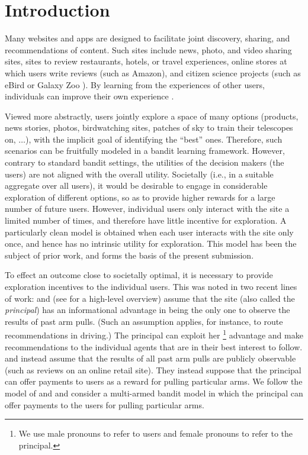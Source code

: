 \section{Introduction} \label{sec:introduction}

Many websites and apps are designed to facilitate joint discovery,
sharing, and recommendations of content.
Such sites include news, photo, and video sharing sites,
sites to review restaurants, hotels, or travel experiences,
online stores at which users write reviews (such as Amazon),
and citizen science projects
(such as eBird \citep{sullivan2009ebird,xue-ebird} or Galaxy Zoo \citep{lintott-galaxy-zoo}).
By learning from the experiences of other users, individuals can
improve their own experience \citep{schmit2017human}.

Viewed more abstractly, users jointly explore a space of
many options (products, news stories, photos, birdwatching sites,
patches of sky to train their telescopes on, $\ldots$),
with the implicit goal of identifying the ``best'' ones.
Therefore, such scenarios can be fruitfully modeled in a bandit
learning framework.
However, contrary to standard bandit settings, the utilities of the
decision makers (the users) are not aligned with the overall utility.
Societally (i.e., in a suitable aggregate over all users),
it would be desirable to engage in considerable exploration of
different options, so as to provide higher rewards for a large number
of future users.
However, individual users only interact with the site a limited number
of times, and therefore have little incentive for exploration.
A particularly clean model is obtained when each user interacts with the
site only once, and hence has no intrinsic utility for exploration. 
This model has been the subject of prior work, and forms the basis of
the present submission.

To effect an outcome close to societally optimal,
it is necessary to provide exploration incentives to the individual users.
This was noted in two recent lines of work:
\citet{kremer2014implementing}
and
\citet{mansour2015bayesian,mansour2016bayesian,mansour2018competition}
(see \cite{slivkins:asymmetry} for a high-level overview)
assume that the site (also called the \emph{principal}) has an
informational advantage in being the only one to observe the results
of past arm pulls.
(Such an assumption applies, for instance, to route recommendations in
driving.)
The principal can exploit her%
\footnote{We use male pronouns to refer to users and female pronouns
  to refer to the principal.}
advantage and make recommendations to the individual agents that 
are in their best interest to follow.
\citet{frazier2014incentivizing} and 
\citet{han2015incentivizing} instead assume that the results of all
past arm pulls are publicly observable
(such as reviews on an online retail site).
They instead suppose that the principal can offer payments to users as
a reward for pulling particular arms.
We follow the model of \citet{frazier2014incentivizing} and
\citet{han2015incentivizing} 
and consider a multi-armed bandit model in which the principal can
offer payments to the users for pulling particular arms.

